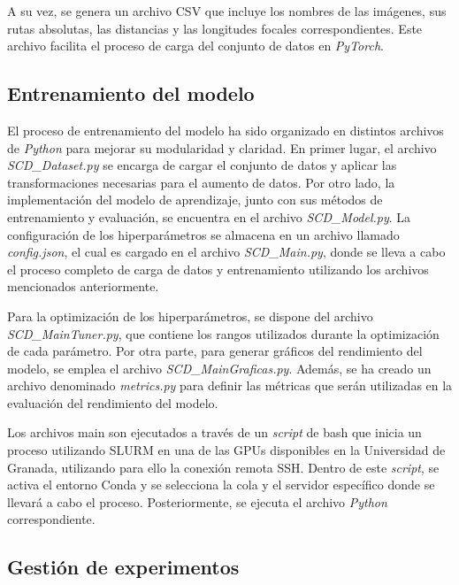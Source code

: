 A su vez, se genera un archivo CSV que incluye los nombres de las imágenes, sus rutas absolutas, las distancias y las longitudes focales correspondientes. Este archivo facilita el proceso de carga del conjunto de datos en \textit{PyTorch}.

\subsection{Entrenamiento del modelo}

El proceso de entrenamiento del modelo ha sido organizado en distintos archivos de \textit{Python} para mejorar su modularidad y claridad. En primer lugar, el archivo \textit{SCD\_Dataset.py} se encarga de cargar el conjunto de datos y aplicar las transformaciones necesarias para el aumento de datos. Por otro lado, la implementación del modelo de aprendizaje, junto con sus métodos de entrenamiento y evaluación, se encuentra en el archivo \textit{SCD\_Model.py}. La configuración de los hiperparámetros se almacena en un archivo llamado \textit{config.json}, el cual es cargado en el archivo \textit{SCD\_Main.py}, donde se lleva a cabo el proceso completo de carga de datos y entrenamiento utilizando los archivos mencionados anteriormente.

Para la optimización de los hiperparámetros, se dispone del archivo \textit{SCD\_MainTuner.py}, que contiene los rangos utilizados durante la optimización de cada parámetro. Por otra parte, para generar gráficos del rendimiento del modelo, se emplea el archivo \textit{SCD\_MainGraficas.py}. Además, se ha creado un archivo denominado \textit{metrics.py} para definir las métricas que serán utilizadas en la evaluación del rendimiento del modelo.

Los archivos main son ejecutados a través de un \textit{script} de bash que inicia un proceso utilizando SLURM en una de las GPUs disponibles en la Universidad de Granada, utilizando para ello la conexión remota SSH. Dentro de este \textit{script}, se activa el entorno Conda y se selecciona la cola y el servidor específico donde se llevará a cabo el proceso. Posteriormente, se ejecuta el archivo \textit{Python} correspondiente.

\subsection{Gestión de experimentos}

